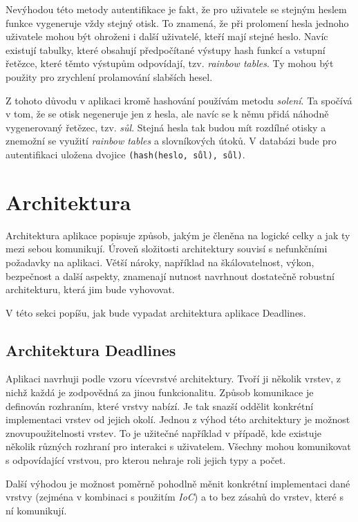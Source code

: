 \documentclass[thesis=B,czech]{FITthesis}[2012/06/26]
\begin{document}
		Nevýhodou této metody autentifikace je fakt, že pro uživatele se stejným heslem funkce vygeneruje vždy stejný otisk. To znamená, že při prolomení hesla jednoho uživatele mohou být ohroženi i další uživatelé, kteří mají stejné heslo. Navíc existují tabulky, které obsahují předpočítané výstupy hash funkcí a vstupní řetězce, které těmto výstupům odpovídají, tzv. \textit{rainbow tables}. \cite{rainbow-table} Ty mohou být použity pro zrychlení prolamování slabších hesel. 
		
		Z tohoto důvodu v aplikaci kromě hashování používám metodu \textit{solení}. Ta spočívá v tom, že se otisk negeneruje jen z hesla, ale navíc se k němu přidá náhodně vygenerovaný řetězec, tzv. \textit{sůl}. Stejná hesla tak budou mít rozdílné otisky a znemožní se využití \textit{rainbow tables} a slovníkových útoků. V databázi bude pro autentifikaci uložena dvojice \texttt{(hash(heslo, sůl), sůl)}. \cite{hash-function}
				
	\section{Architektura}
		Architektura aplikace popisuje způsob, jakým je členěna na logické celky a jak ty mezi sebou komunikují. Úroveň složitosti architektury souvisí s nefunkčními požadavky na aplikaci. Větší nároky, například na škálovatelnost, výkon, bezpečnost a další aspekty, znamenají nutnost navrhnout dostatečně robustní architekturu, která jim bude vyhovovat. 
		
		V této sekci popíšu, jak bude vypadat architektura aplikace Deadlines.
		
	\subsection{Architektura Deadlines}	
		Aplikaci navrhuji podle vzoru vícevrstvé architektury. Tvoří ji několik vrstev, z nichž každá je zodpovědná za jinou funkcionalitu. Způsob komunikace je definován rozhraním, které vrstvy nabízí. Je tak snazší oddělit konkrétní implementaci vrstev od jejich okolí. Jednou z výhod této architektury je možnost znovupoužitelnosti vrstev. To je užitečné například v případě, kde existuje několik různých rozhraní pro interakci s uživatelem. Všechny mohou komunikovat s odpovídající vrstvou, pro kterou nehraje roli jejich typy a počet.
		
		Další výhodou je možnost poměrně pohodlně měnit konkrétní implementaci dané vrstvy (zejména v kombinaci s použitím \textit{IoC}) a to bez zásahů do vrstev, které s ní komunikují. 
		
\end{document}
